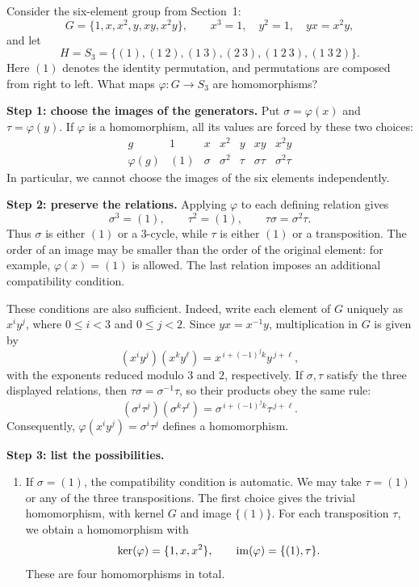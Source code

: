\documentclass[reqno,11pt]{amsart}
\begin{document}
\begin{example}
Consider the six-element group from Section~1:
\[
  G=\{1,x,x^2,y,xy,x^2y\},
  \qquad x^3=1,\quad y^2=1,\quad yx=x^2y,
\]
and let
\[
  H=S_3=\{(1),(1\ 2),(1\ 3),(2\ 3),(1\ 2\ 3),(1\ 3\ 2)\}.
\]
Here $(1)$ denotes the identity permutation, and permutations are composed
from right to left. What maps $\varphi:G\to S_3$ are homomorphisms?

\smallskip
\noindent\textbf{Step 1: choose the images of the generators.}
Put $\sigma=\varphi(x)$ and $\tau=\varphi(y)$. If $\varphi$ is a
homomorphism, all its values are forced by these two choices:
\[
\begin{array}{c|cccccc}
  g&1&x&x^2&y&xy&x^2y\\ \hline
  \varphi(g)&(1)&\sigma&\sigma^2&\tau&\sigma\tau&\sigma^2\tau
\end{array}
\]
In particular, we cannot choose the images of the six elements independently.

\smallskip
\noindent\textbf{Step 2: preserve the relations.}
Applying $\varphi$ to each defining relation gives
\[
  \sigma^3=(1),\qquad \tau^2=(1),\qquad
  \tau\sigma=\sigma^2\tau.
\]
Thus $\sigma$ is either $(1)$ or a $3$-cycle, while $\tau$ is either
$(1)$ or a transposition. The order of an image may be smaller than the
order of the original element: for example, $\varphi(x)=(1)$ is allowed.
The last relation imposes an additional compatibility condition.

These conditions are also sufficient. Indeed, write each element of $G$
uniquely as $x^iy^j$, where $0\leq i<3$ and $0\leq j<2$. Since
$yx=x^{-1}y$, multiplication in $G$ is given by
\[
  (x^iy^j)(x^ky^\ell)=x^{\,i+(-1)^jk}y^{\,j+\ell},
\]
with the exponents reduced modulo $3$ and $2$, respectively. If
$\sigma,\tau$ satisfy the three displayed relations, then
$\tau\sigma=\sigma^{-1}\tau$, so their products obey the same rule:
\[
  (\sigma^i\tau^j)(\sigma^k\tau^\ell)
  =\sigma^{\,i+(-1)^jk}\tau^{\,j+\ell}.
\]
Consequently, $\varphi(x^iy^j)=\sigma^i\tau^j$ defines a homomorphism.

\smallskip
\noindent\textbf{Step 3: list the possibilities.}
\begin{enumerate}[label=\textbf{(\arabic*)}]
  \item If $\sigma=(1)$, the compatibility condition is automatic.
  We may take $\tau=(1)$ or any of the three transpositions.
  The first choice gives the trivial homomorphism, with kernel $G$ and
  image $\{(1)\}$. For each transposition $\tau$, we obtain a homomorphism
  with
  \[
    \ker(\varphi)=\{1,x,x^2\},\qquad
    \operatorname{im}(\varphi)=\{(1),\tau\}.
  \]
  These are four homomorphisms in total.


\end{enumerate}
\end{example}
\end{document}
